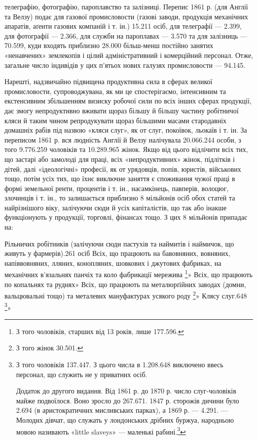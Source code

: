 \parcont{}  %
телеграфію, фотографію, пароплавство та залізниці. Перепис
1861 р. (для Англії та Велзу) подає для газової промисловости
(газові заводи, продукція механічних апаратів, аґенти газових
компаній і т. ін.) 15.211 осіб, для телеграфії — 2.399, для фотографії
— 2.366, для служби на пароплавах — 3.570 та для залізниць —
70.599, куди входять приблизно 28.000 більш-менш постійно
занятих «ненавчених» землекопів і цілий адміністративний і комерційний
персонал. Отже, загальне число індивідів у цих п’ятьох
нових галузях промисловости — 94.145.

Нарешті, надзвичайно підвищена продуктивна сила в сферах
великої промисловости, супроводжувана, як ми це спостерігаємо,
інтенсивним та екстенсивним збільшенням визиску робочої
сили по всіх інших сферах продукції, дає змогу непродуктивно
вживати щораз більшу й більшу частину робітничої кляси й таким
чином репродукувати щораз більшими масами стародавніх домашніх
рабів під назвою «кляси слуг», як от слуг, покоївок, льокаїв
і т. ін. За переписом 1861 р. вся людність Англії й Велзу налічувала
20.066.244 особи, з того 9.776.259 чоловіків та 10.289.965 жінок.
Якщо від цього відлічити всіх тих, що застарі або замолоді
для праці, всіх «непродуктивних» жінок, підлітків і дітей,
далі «ідеологічні» професії, як от урядовців, попів, юристів,
військових тощо, потім усіх тих, що їхнє виключне заняття є
споживання чужої праці в формі земельної ренти, процентів і
т. ін., насамкінець, павперів, волоцюг, злочинців і т. ін., то залишається
приблизно 8 мільйонів осіб обох статей та найрізнішого
віку, залічуючи сюди й усіх капіталістів, що так або інакше
функціонують у продукції, торговлі, фінансах тощо. З цих 8 мільйонів
припадає на:

Рільничих робітників (залічуючи сюди пастухів та
наймитів і наймичок, що живуть у фармерів).261 осіб
Всіх, що працюють на бавовняних, вовняних, напіввовняних,
лляних, конопляних, шовкових
і джутових фабриках, на механічних в’язальнях
панчіх та коло фабрикації мережива \footnote{
З того чоловіків, старших від 13 років, лише 177.596.
}»
Всіх, що працюють по копальнях та руднях»
Всіх, що працюють па металюрґійних заводах
(домни, вальцювальні тощо) та металевих мануфактурах усякого
роду \footnote{
З того жінок 30.501.
}»
Клясу слуг.648 \footnote{
З того чоловіків 137.447. З цього числа в 1.208.648 виключено ввесь
персонал, що служить не у приватних осіб.

Додаток до другого видання. Від 1861 р. до 1870 р. число слуг-чоловіків
майже подвоїлося. Воно зросло до 267.671. 1847 р. сторожів дичини
було 2.694 (в аристократичних мисливських парках), а 1869 р. — 4.291.
— Молодих дівчат, що служать у лондонських дрібних буржуа, народньою
мовою називають «little slaveys» — маленькі рабині.\footnote*{
Тут у власному Марксовому примірнику 1 німецького видання є
така цитата з «Evening Star» від 11 вересня 1868 р.: «Як виснажують над-
}
}»


